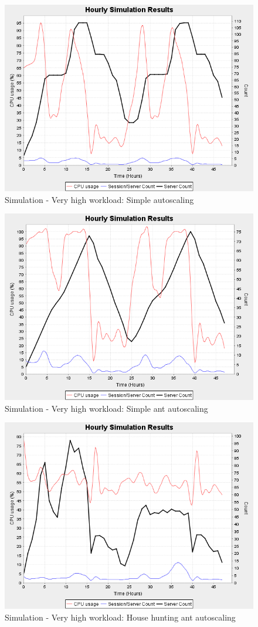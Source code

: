 \documentclass[conference]{IEEEtran}
\begin{document}
\begin{figure}
	\centering
		\includegraphics[width=0.75\columnwidth]{results/sim3/sim3-basestats.png}
	\caption{Simulation - Very high workload: Simple autoscaling}
	\label{fig:sim3-basestats}
\end{figure}

\begin{figure}
	\centering
		\includegraphics[width=0.75\columnwidth]{results/sim3/sim3-antSimplestats.png}
	\caption{Simulation - Very high workload: Simple ant autoscaling}
	\label{fig:sim3-antSimplestats}
\end{figure}

\begin{figure}
	\centering
		\includegraphics[width=0.75\columnwidth]{results/sim3/sim3-antHHstats.png}
	\caption{Simulation - Very high workload: House hunting ant autoscaling}
	\label{fig:sim3-antHHstats}
\end{figure}
\end{document}
